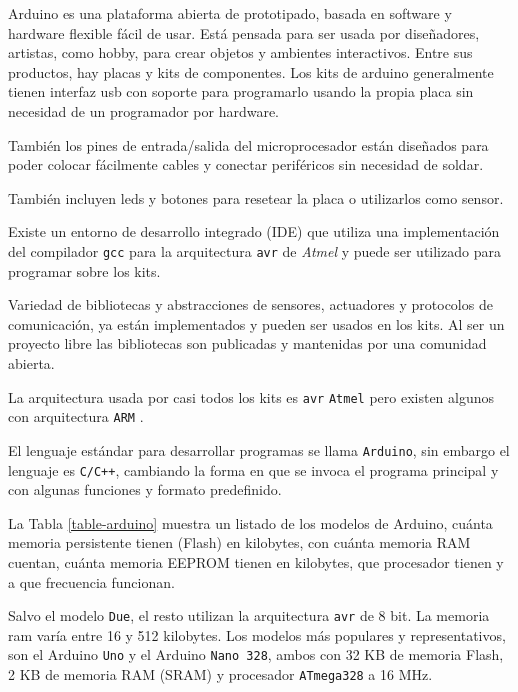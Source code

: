
  Arduino \cite{arduino} es una plataforma abierta de prototipado, basada en
software y hardware flexible fácil de usar.
  Está pensada para ser usada por diseñadores, artistas, como
hobby, para crear objetos y ambientes interactivos.
  Entre sus productos, hay placas y kits de componentes.
  Los kits de arduino generalmente tienen interfaz usb con soporte
para programarlo usando la propia placa sin necesidad de un
programador por hardware.

  También los pines de entrada/salida del microprocesador
están diseñados para poder colocar fácilmente cables y
conectar periféricos sin necesidad de soldar.

  También incluyen leds y botones para resetear la placa o
utilizarlos como sensor.

  Existe un entorno de desarrollo integrado (IDE) que utiliza
una implementación del compilador \texttt{gcc} \cite{gcc} para la arquitectura
\texttt{avr} \cite{avr} de \textit{Atmel} \cite{atmel} y puede ser utilizado
para programar sobre los kits.

  Variedad de bibliotecas y abstracciones de sensores, actuadores y
protocolos de comunicación, ya están implementados y pueden ser
usados en los kits.
  Al ser un proyecto libre las bibliotecas son publicadas y mantenidas
por una comunidad abierta.

  La arquitectura usada por casi todos los kits
es \texttt{avr} \texttt{Atmel} pero existen algunos con
arquitectura \texttt{ARM} \cite{arm}.

  El lenguaje estándar para desarrollar programas se llama \texttt{Arduino},
sin embargo el lenguaje es \texttt{C/C++}, cambiando la forma en que
se invoca el programa principal y con algunas funciones y
formato predefinido.

  La Tabla \ref{table-arduino} muestra un listado de los modelos
de Arduino, cuánta memoria persistente tienen (Flash) en kilobytes, con
cuánta memoria RAM cuentan, cuánta memoria EEPROM tienen en kilobytes,
que procesador tienen y a que frecuencia funcionan.

  Salvo el modelo \texttt{Due}, el resto utilizan la
arquitectura \texttt{avr} de 8 bit. La memoria ram varía entre
16 y 512 kilobytes.
  Los modelos más populares y representativos, son el Arduino \texttt{Uno}
y el Arduino \texttt{Nano 328}, ambos con 32 KB de memoria Flash, 2 KB de memoria
RAM (SRAM) y procesador \texttt{ATmega328} a 16 MHz.

